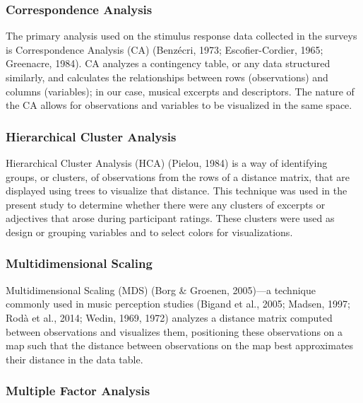 \documentclass[
  english,
  man,floatsintext]{apa6}
\begin{document}
\hypertarget{correspondence-analysis}{%
\subsubsection{Correspondence Analysis}\label{correspondence-analysis}}

The primary analysis used on the stimulus response data collected in the surveys is Correspondence Analysis (CA) (Benzécri, 1973; Escofier-Cordier, 1965; Greenacre, 1984). CA analyzes a contingency table, or any data structured similarly, and calculates the relationships between rows (observations) and columns (variables); in our case, musical excerpts and descriptors. The nature of the CA allows for observations and variables to be visualized in the same space.

\hypertarget{hierarchical-cluster-analysis}{%
\subsubsection{Hierarchical Cluster Analysis}\label{hierarchical-cluster-analysis}}

Hierarchical Cluster Analysis (HCA) (Pielou, 1984) is a way of identifying groups, or clusters, of observations from the rows of a distance matrix, that are displayed using trees to visualize that distance. This technique was used in the present study to determine whether there were any clusters of excerpts or adjectives that arose during participant ratings. These clusters were used as design or grouping variables and to select colors for visualizations.

\hypertarget{multidimensional-scaling}{%
\subsubsection{Multidimensional Scaling}\label{multidimensional-scaling}}

Multidimensional Scaling (MDS) (Borg \& Groenen, 2005)---a technique commonly used in music perception studies (Bigand et al., 2005; Madsen, 1997; Rodà et al., 2014; Wedin, 1969, 1972) analyzes a distance matrix computed between observations and visualizes them, positioning these observations on a map such that the distance between observations on the map best approximates their distance in the data table.

\hypertarget{multiple-factor-analysis}{%
\subsubsection{Multiple Factor Analysis}\label{multiple-factor-analysis}}
\end{document}
